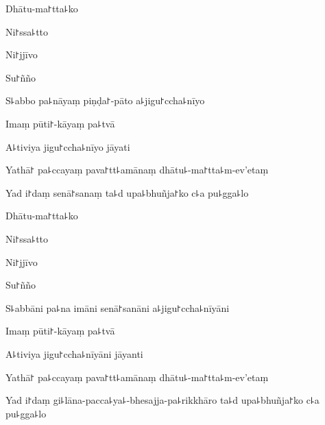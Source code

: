 Dhātu-ma꜓tta꜕ko


Ni꜓ssa꜕tto


Ni꜓jjīvo


Su꜓ñño


S꜕abbo pa꜕nāyaṃ piṇḍa꜓-pāto a꜕jigu꜓ccha꜕nīyo


Imaṃ pūti꜓-kāyaṃ pa꜕tvā


A꜕tiviya jigu꜓ccha꜕nīyo jāyati


Yathā꜓ pa꜕ccayaṃ pava꜓tt꜕amānaṃ dhātu꜕-ma꜓tta꜕m-ev'etaṃ


Yad i꜓daṃ senā꜓sanaṃ ta꜕d upa꜕bhuñja꜓ko c꜕a pu꜕gga꜕lo


Dhātu-ma꜓tta꜕ko


Ni꜓ssa꜕tto


Ni꜓jjīvo


Su꜓ñño


S꜕abbāni pa꜕na imāni senā꜓sanāni a꜕jigu꜓ccha꜕nīyāni


Imaṃ pūti꜓-kāyaṃ pa꜕tvā


A꜕tiviya jigu꜓ccha꜕nīyāni jāyanti


Yathā꜓ pa꜕ccayaṃ pava꜓tt꜕amānaṃ dhātu꜕-ma꜓tta꜕m-ev'etaṃ


Yad i꜓daṃ gi꜕lāna-pacca꜕ya꜕-bhesajja-pa꜕rikkhāro ta꜕d upa꜕bhuñja꜓ko c꜕a pu꜕gga꜕lo

